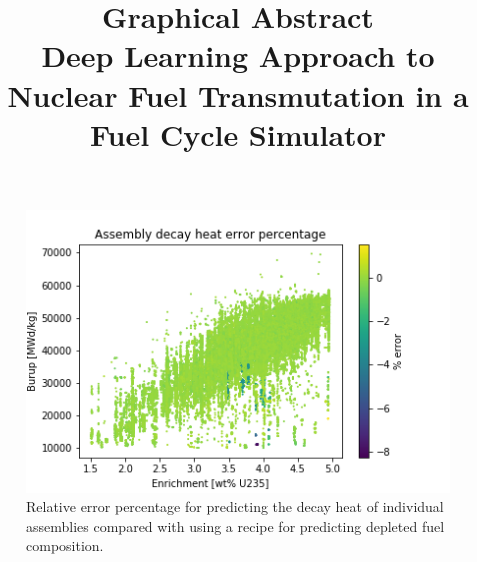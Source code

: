 \documentclass[review]{elsarticle}
\begin{document}
\begin{frontmatter}
\title{Graphical Abstract\\
Deep Learning Approach to Nuclear Fuel Transmutation in a Fuel Cycle Simulator}
\date{}                     %

\end{frontmatter}



\begin{figure}[h]
    \centering
    \includegraphics[width=\textwidth]{assem_dh.png}
    \caption{Relative error percentage for predicting the decay
             heat of individual assemblies compared with
             using a recipe for predicting depleted fuel
             composition.}
    \label{fig:assem_dh}
\end{figure}
\end{document}
